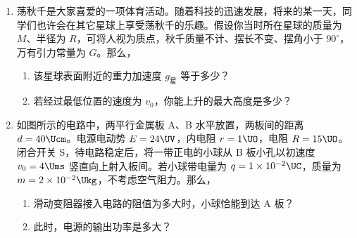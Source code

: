 \documentclass[\gkver]{gaokaozhenti}
\begin{document}
\begin{enumerate}
{（2）①由米尺读数得金属丝长度为 $972.0\Umm$；②用累积法，在铅笔上紧密排绕金属丝 $N$ 匝，用米尺量出该 $N$ 匝金属丝的宽度 $D$，则金属丝的平均直径 $d=\frac{D}{N}$。
}

\item
荡秋千是大家喜爱的一项体育活动。随着科技的迅速发展，将来的某一天，同学们也许会在其它星球上享受荡秋千的乐趣。假设你当时所在星球的质量为 $M$、半径为 $R$，可将人视为质点，秋千质量不计、摆长不变、摆角小于 $90^{\circ}$，万有引力常量为 $G$。那么，

\begin{enumerate}
	\item
	该星球表面附近的重力加速度 $g_{\text{星}}$ 等于多少？
	\item
	若经过最低位置的速度为 $v_{0}$，你能上升的最大高度是多少？
\end{enumerate}

\item
如图所示的电路中，两平行金属板 A、B 水平放置，两板间的距离 $d = 40\Ucm$。电源电动势 $E = 24\UV$，内电阻 $r = 1\UO$，电阻 $R = 15\UO$。闭合开关 S，待电路稳定后，将一带正电的小球从 B 板小孔以初速度 $v_{0} = 4\Ums$ 竖直向上射入板间。若小球带电量为 $q = 1\times10^{-2}\UC$，质量为 $m = 2\times10^{-2}\Ukg$，不考虑空气阻力。那么，

\begin{enumerate}
	\item
	滑动变阻器接入电路的阻值为多大时，小球恰能到达 A 板？
	\item
	此时，电源的输出功率是多大？
\end{enumerate}


\end{enumerate}
\end{document}
